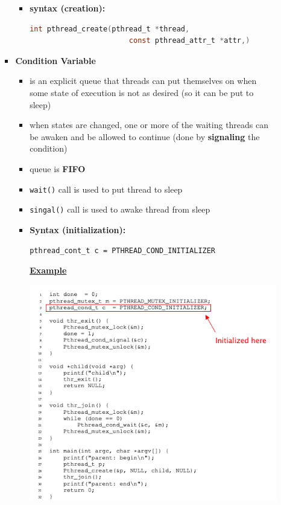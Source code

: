 \documentclass[12pt]{article}
\begin{document}
\begin{enumerate}[1.]
\begin{enumerate}[a)]
\begin{itemize}
            \begin{itemize}
                \item \textbf{syntax (creation):}

                \bigskip
\begin{lstlisting}[language=c]
    int pthread_create(pthread_t *thread,
                       const pthread_attr_t *attr,)
\end{lstlisting}
            \end{itemize}
            \item \textbf{Condition Variable}

            \begin{itemize}
                \item is an explicit queue that threads can put themselves on when some
                state of execution is not as desired (so it can be put to sleep)
                \item when states are changed, one or more of the waiting threads can be
                awaken and be allowed to continue (done by \textbf{signaling} the condition)
                \item queue is \textbf{FIFO}
                \item \texttt{wait()} call is used to put thread to sleep
                \item \texttt{singal()} call is used to awake thread from sleep
                \item \textbf{Syntax (initialization):}

                \bigskip

                \texttt{pthread\_cont\_t c = PTHREAD\_COND\_INITIALIZER}

                \bigskip

                \underline{\textbf{Example}}

                \begin{center}
                \includegraphics[width=\linewidth]{images/midterm_2_solution_16.png}
                \end{center}


\end{itemize}
\end{itemize}
\end{enumerate}
\end{enumerate}
\end{document}
